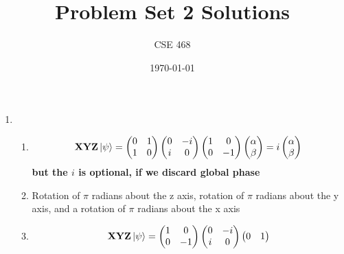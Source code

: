\documentclass[12pt]{article}
\title{Problem Set 2 Solutions}
\author{CSE 468}
\date{\today}
\begin{document}
\maketitle

\begin{enumerate}[font=\bfseries]
    \item 
    \begin{enumerate}
        \item \[ \mathbf{X}\mathbf{Y}\mathbf{Z}\ket{\psi} = 
                \begin{pmatrix} 
                0 & 1 \\
                1 & 0
                \end{pmatrix} 
                \begin{pmatrix} 
                0 & -i \\
                i & 0
                \end{pmatrix} 
                 \begin{pmatrix} 
                1 & 0 \\
                0 & -1
                \end{pmatrix} 
                 \begin{pmatrix} 
                \alpha \\ \beta
                \end{pmatrix} 
                =
                i
                \begin{pmatrix} 
                \alpha \\ \beta
                \end{pmatrix} 
                \] {\bf but the $i$ is optional, if we discard global phase}
        \item Rotation of $\pi$ radians about the z axis, rotation of $\pi$ radians about the y axis, and a rotation of $\pi$ radians about the x axis
        \item \[ \mathbf{X}\mathbf{Y}\mathbf{Z}\ket{\psi} = 
                \begin{pmatrix} 
                1 & 0 \\
                0 & -1
                \end{pmatrix} 
                \begin{pmatrix} 
                0 & -i \\
                i & 0
                \end{pmatrix} 
                 \begin{pmatrix} 
                0 & 1 \\

\end{pmatrix}\]
\end{enumerate}
\end{enumerate}
\end{document}
